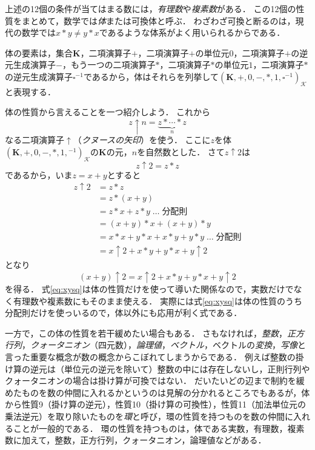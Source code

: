 \documentclass[twocolumn]{jsbook}
\newcommand{\mathSomething}{\square}
\newcommand{\mathSet}[1]{\mathbf{#1}}
\newcommand{\mathField}[7]{(#1,#2,#3,#4,#5,#6,#7)_\mathcal{K}}
\newcommand{\keyword}[1]{\emph{#1}}
\begin{document}
上述の12個の条件が当てはまる数には，\keyword{有理数}や\keyword{複素数}がある．
この12個の性質をまとめて，数学では\keyword{体}または可換体と呼ぶ．
わざわざ可換と断るのは，現代の数学では$x*y\neq y*x$であるような体系がよく用いられるからである．

体の要素は，集合$\mathSet{K}$，二項演算子$+$，二項演算子$+$の単位元$0$，二項演算子$+$の逆元生成演算子$-$，もう一つの二項演算子$*$，二項演算子$*$の単位元$1$，二項演算子$*$の逆元生成演算子$\mathSomething^{-1}$であるから，体はそれらを列挙して$\mathField{\mathSet{K}}{+}{0}{-}{*}{1}{\mathSomething^{-1}}$と表現する．

体の性質から言えることを一つ紹介しよう．
これから$$z\uparrow n=\underbrace{z*\dotsb*z}_n$$なる二項演算子$\uparrow$（\keyword{クヌースの矢印}）を使う．
ここに$z$を体$\mathField{\mathSet{K}}{+}{0}{-}{*}{1}{{}^{-1}}$の$\mathSet{K}$の元，$n$を自然数とした．
さて$z\uparrow2$は$$z\uparrow2=z*z$$であるから，いま$z=x+y$とすると
\begin{align*}
z\uparrow2&=z*z\\
&=z*(x+y)\\
&=z*x+z*y\;\dots\;\text{分配則}\\
&=(x+y)*x+(x+y)*y\\
&=x*x+y*x+x*y+y*y\;\dots\;\text{分配則}\\
&=x\uparrow2+x*y+y*x+y\uparrow2
\end{align*}
となり
\begin{equation}
\label{eq:xysq}
(x+y)\uparrow2=x\uparrow2+x*y+y*x+y\uparrow2
\end{equation}
を得る．
式\eqref{eq:xysq}は体の性質だけを使って導いた関係なので，実数だけでなく有理数や複素数にもそのまま使える．
実際には式\eqref{eq:xysq}は体の性質のうち分配則だけを使っいるので，体以外にも応用が利く式である．

一方で，この体の性質を若干緩めたい場合もある．
さもなければ，\keyword{整数}，\keyword{正方行列}，\keyword{クォータニオン}（四元数），\keyword{論理値}，\keyword{ベクトル}，ベクトルの\keyword{変換}，\keyword{写像}と言った重要な概念が数の概念からこぼれてしまうからである．
例えば整数の掛け算の逆元は（単位元の逆元を除いて）整数の中には存在しないし，正則行列やクォータニオンの場合は掛け算が可換ではない．
だいたいどの辺まで制約を緩めたものを数の仲間に入れるかというのは見解の分かれるところでもあるが，体から性質9（掛け算の逆元），性質10（掛け算の可換性），性質11（加法単位元の乗法逆元）を取り除いたものを\keyword{環}と呼び，環の性質を持つものを数の仲間に入れることが一般的である．
環の性質を持つものは，体である実数，有理数，複素数に加えて，整数，正方行列，クォータニオン，論理値などがある．
\end{document}
